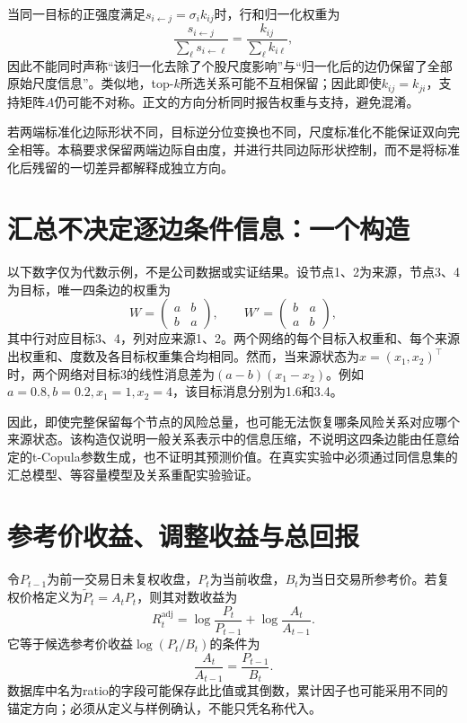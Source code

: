 当同一目标的正强度满足$s_{i\leftarrow j}=\sigma_i k_{ij}$时，行和归一化权重为
\begin{equation}
\frac{s_{i\leftarrow j}}{\sum_{\ell}s_{i\leftarrow\ell}}
=\frac{k_{ij}}{\sum_{\ell}k_{i\ell}},
\end{equation}
因此不能同时声称“该归一化去除了个股尺度影响”与“归一化后的边仍保留了全部原始尺度信息”。类似地，top-$k$所选关系可能不互相保留；因此即使$k_{ij}=k_{ji}$，支持矩阵$A$仍可能不对称。正文的方向分析同时报告权重与支持，避免混淆。

若两端标准化边际形状不同，目标逆分位变换也不同，尺度标准化不能保证双向完全相等。本稿要求保留两端边际自由度，并进行共同边际形状控制，而不是将标准化后残留的一切差异都解释成独立方向。

\section{汇总不决定逐边条件信息：一个构造}
以下数字仅为代数示例，不是公司数据或实证结果。设节点1、2为来源，节点3、4为目标，唯一四条边的权重为
\begin{equation}
W=\begin{pmatrix} a&b\\ b&a\end{pmatrix},\qquad
W'=\begin{pmatrix} b&a\\ a&b\end{pmatrix},
\end{equation}
其中行对应目标3、4，列对应来源1、2。两个网络的每个目标入权重和、每个来源出权重和、度数及各目标权重集合均相同。然而，当来源状态为$x=(x_1,x_2)^\top$时，两个网络对目标3的线性消息差为$(a-b)(x_1-x_2)$。例如$a=0.8,b=0.2,x_1=1,x_2=4$，该目标消息分别为1.6和3.4。

因此，即使完整保留每个节点的风险总量，也可能无法恢复哪条风险关系对应哪个来源状态。该构造仅说明一般关系表示中的信息压缩，不说明这四条边能由任意给定的t-Copula参数生成，也不证明其预测价值。在真实实验中必须通过同信息集的汇总模型、等容量模型及关系重配实验验证。

\section{参考价收益、调整收益与总回报}
令$P_{t-1}$为前一交易日未复权收盘，$P_t$为当前收盘，$B_t$为当日交易所参考价。若复权价格定义为$\widetilde P_t=A_tP_t$，则其对数收益为
\begin{equation}
R_t^{\mathrm{adj}}=\log\frac{P_t}{P_{t-1}}+\log\frac{A_t}{A_{t-1}}.
\end{equation}
它等于候选参考价收益$\log(P_t/B_t)$的条件为
\begin{equation}
\frac{A_t}{A_{t-1}}=\frac{P_{t-1}}{B_t}.
\end{equation}
数据库中名为ratio的字段可能保存此比值或其倒数，累计因子也可能采用不同的锚定方向；必须从定义与样例确认，不能只凭名称代入。

